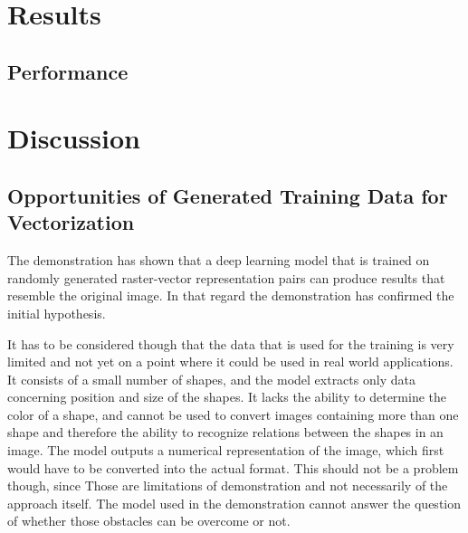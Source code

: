 \documentclass[12pt, a4paper, titlepage]{report}
\begin{document}



\chapter{Results}

\section{Performance}




\chapter{Discussion}

\section{Opportunities of Generated Training Data for Vectorization}

The demonstration has shown that a deep learning model that is trained on randomly generated raster-vector representation pairs can produce results that resemble the original image. In that regard the demonstration has confirmed the initial hypothesis.

It has to be considered though that the data that is used for the training is very limited and not yet on a point where it could be used in real world applications. It consists of a small number of shapes, and the model extracts only data concerning position and size of the shapes. It lacks the ability to determine the color of a shape, and cannot be used to convert images containing more than one shape and therefore the ability to recognize relations between the shapes in an image. The model outputs a numerical representation of the image, which first would have to be converted into the actual format. This should not be a problem though, since 
Those are limitations of demonstration and not necessarily of the approach itself. The model used in the demonstration cannot answer the question of whether those obstacles can be overcome or not.
\end{document}
